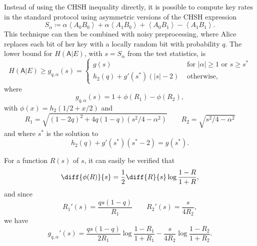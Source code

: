 \documentclass[10pt, a4paper]{article}
\numberwithin{equation}{section} %
\theoremstyle{definition}
\theoremstyle{plain}
\newcommand{\abs}[1]{\left\lvert#1\right\rvert}
\newcommand{\?}{\mathrel{?}} %
\newcommand{\angleb}[1]{\left\langle #1 \right\rangle} %
\newcommand{\crv}[1]{\mathsf{#1}}
\begin{document}
      Instead of using the CHSH inequality directly, it is possible to compute key rates in the standard protocol using asymmetric versions of the CHSH expression
      \begin{equation}
        S_{\alpha} \coloneqq \alpha\angleb{A_0 B_0} + \alpha\angleb{A_1 B_0} + \angleb{A_0 B_1} - \angleb{A_1 B_1}.
      \end{equation}
      This technique can then be combined with noisy preprocessing, where Alice replaces each bit of her key with a locally random bit with probability \(q\). The lower bound for \(H(\crv{A}|E)\), with \(s = S_{\alpha}\) from the test statistics, is
      \begin{equation} H(\crv{A}|E) \geq g_{q,\alpha}(s) = \begin{cases}
        g(s) & \text{ for } \abs{\alpha} \geq 1 \text{ or } s \geq s^* \\
        h_2(q) + g'(s^*)(\abs{s}-2) & \text{ otherwise},
      \end{cases}
    \end{equation}
    where
    \begin{equation}
      g_{q,\alpha}(s) = 1 + \phi\left(R_1\right) - \phi\left(R_2\right),
    \end{equation}
    with \(\phi(x) = h_2(1/2 + x/2)\) and
    \begin{equation} 
      R_1 = \sqrt{{(1-2q)}^2 + 4q(1-q)(s^2/4-\alpha^2)} \qquad R_2 = \sqrt{s^2/4-\alpha^2}
    \end{equation}
    and where \(s^*\) is the solution to
    \begin{equation}\label{eqn:sstar}
      h_2(q) + g'(s^*) (s^*-2) = g(s^*).
    \end{equation}

    For a function \(R(s)\) of \(s\), it can easily be verified that
    \begin{equation}
      \diff{\phi(R)}{s} = \frac{1}{2} \diff{R}{s} \log\frac{1-R}{1+R},
    \end{equation}
    and since
    \begin{equation} 
      R_1'(s) = \frac{qs(1-q)}{R_1} \qquad R_2'(s) = \frac{s}{4R_2},
    \end{equation}
    we have
    \begin{equation}\label{eqn:diffg}
      g_{q,\alpha}'(s) = \frac{qs(1-q)}{2R_1} \log\frac{1-R_1}{1+R_1} - \frac{s}{4R_2} \log\frac{1-R_2}{1+R_2}.
    \end{equation}
\end{document}
